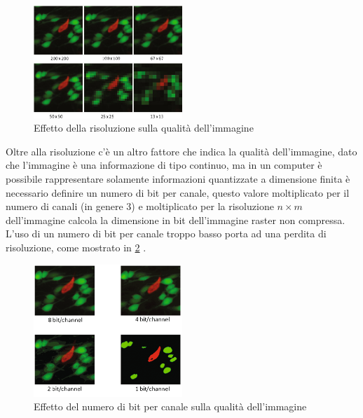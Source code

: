 \begin{figure}[ht]
    \centering
    \includegraphics[width=0.5\textwidth]{frame/resolution-on-image-quality.png}
    \caption{Effetto della risoluzione sulla qualità dell'immagine}
    \label{fig:resolution-on-image-quality}
\end{figure}

Oltre alla risoluzione c'è un altro fattore che indica la qualità dell'immagine, dato che l'immagine è una informazione di tipo continuo, ma in un computer è possibile rappresentare solamente informazioni quantizzate a dimensione finita è necessario definire un numero di bit per canale, questo valore moltiplicato per il numero di canali (in genere 3) e moltiplicato per la risoluzione  \(n\times m\) dell'immagine calcola la dimensione in bit dell'immagine raster non compressa. L'uso di un numero di bit per canale  troppo basso porta ad una perdita di risoluzione, come mostrato in \cref{fig:bit-channel}  \cite{gonzalez_dip} \cite{spaepen_resolution}.

\begin{figure}[ht]
    \centering
    \includegraphics[width=0.5\textwidth]{frame/bit-channel.png}
    \caption{Effetto del numero di bit per canale sulla qualità dell'immagine}
    \label{fig:bit-channel}
\end{figure}






